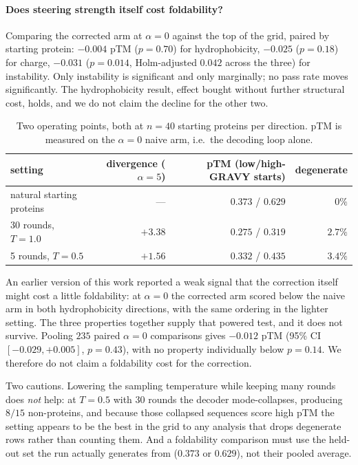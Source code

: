 \documentclass{article}
\begin{document}
\paragraph{Does steering strength itself cost foldability?} Comparing the corrected arm at
$\alpha{=}0$ against the top of the grid, paired by starting protein: $-0.004$ pTM
($p{=}0.70$) for hydrophobicity, $-0.025$ ($p{=}0.18$) for charge, $-0.031$ ($p{=}0.014$,
Holm-adjusted $0.042$ across the three) for instability. Only instability is significant
and only marginally; no pass rate moves significantly. The hydrophobicity result, effect
bought without further structural cost, holds, and we do not claim the decline for the
other two.

\begin{table}[htbp]
\centering
\caption{Two operating points, both at $n{=}40$ starting proteins per direction. pTM is
measured on the $\alpha{=}0$ naive arm, i.e.\ the decoding loop alone.}
\label{tab:steer-ops}
\begin{tabular}{lrrr}
\toprule
setting & divergence ($\alpha{=}5$) & pTM (low/high-GRAVY starts) & degenerate \\
\midrule
natural starting proteins & --- & $0.373$ / $0.629$ & $0\%$ \\
30 rounds, $T{=}1.0$ & $+3.38$ & $0.275$ / $0.319$ & $2.7\%$ \\
5 rounds, $T{=}0.5$ & $+1.56$ & $0.332$ / $0.435$ & $3.4\%$ \\
\bottomrule
\end{tabular}
\end{table}

An earlier version of this work reported a weak signal that the correction itself might
cost a little foldability: at $\alpha{=}0$ the corrected arm scored below the naive arm in
both hydrophobicity directions, with the same ordering in the lighter setting. The three
properties together supply that powered test, and it does not survive. Pooling $235$ paired
$\alpha{=}0$ comparisons gives $-0.012$ pTM (95\% CI $[-0.029, +0.005]$, $p{=}0.43$), with
no property individually below $p{=}0.14$. We therefore do not claim a foldability cost for
the correction.

Two cautions. Lowering the sampling temperature while keeping many rounds does \emph{not}
help: at $T{=}0.5$ with 30 rounds the decoder mode-collapses, producing $8/15$ non-proteins,
and because those collapsed sequences score high pTM the setting appears to be the best in
the grid to any analysis that drops degenerate rows rather than counting them. And a
foldability comparison must use the held-out set the run actually generates from ($0.373$ or
$0.629$), not their pooled average.
\end{document}
